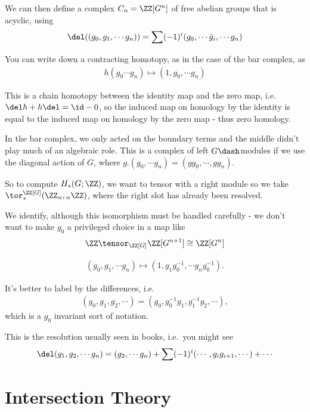 We can then define a complex \(C_n = \ZZ[G^n]\) of free abelian groups
that is acyclic, using
\begin{align*}
\del((g_0, g_1, \cdots g_n)) = \sum (-1)^i (g_0, \cdots \bar g_i, \cdots g_n)
\end{align*}

You can write down a contracting homotopy, as in the case of the bar
complex, as
\begin{align*}
h(g_0 \cdots g_n) \mapsto (1, g_0, \cdots g_n)
  \end{align*}

This is a chain homotopy between the identity map and the zero map,
i.e.~\(\del h + h\del = \id - 0\), so the induced map on homology by the
identity is equal to the induced map on homology by the zero map - thus
zero homology.

In the bar complex, we only acted on the boundary terms and the middle
didn't play much of an algebraic role. This is a complex of left
\(G\dash\)modules if we use the diagonal action of \(G\), where
\(g.(g_0, \cdots g_n) = (gg_0, \cdots , gg_n)\).

So to compute \(H_*(G; \ZZ)\), we want to tensor with a right module so
we take \(\tor_*^{\ZZ[G]}(\ZZ_n, {}_n \ZZ)\), where the right slot has
already been resolved.

We identify, although this isomorphism must be handled carefully - we
don't want to make \(g_0\) a privileged choice in a map like
\begin{align*}
\ZZ \tensor_{\ZZ[G]} \ZZ[G^{n+1}] \cong \ZZ[G^n]
\end{align*}

\begin{align*}
(g_0, g_1, \cdots g_n) \mapsto (1, g_1g_0^{-1}, \cdots g_ng_0^{-1}).\end{align*}

It's better to label by the differences, i.e.~
\begin{align*}
(g_0, g_1, g_2, \cdots) = (g_0, g_0^{-1}g_1, g_1^{-1}g_2, \cdots)
,\end{align*} which is a \(g_0\) invariant sort of notation.

This is the resolution usually seen in books, i.e.~you might see
\begin{align*}
\del(g_1, g_2, \cdots g_n) = (g_2, \cdots g_n) + \sum (-1)^i (\cdots ,g_i g_{i+1}, \cdots) + \cdots
\end{align*}

\hypertarget{intersection-theory}{%
\section{Intersection Theory}\label{intersection-theory}}

